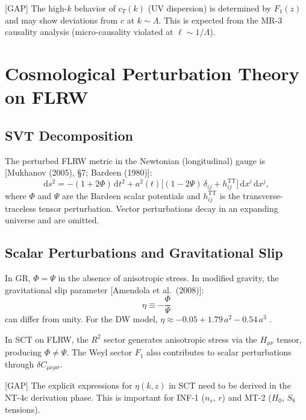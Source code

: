 \documentclass[12pt,a4paper]{article}
\theoremstyle{definition}
\theoremstyle{remark}
\newcommand{\dd}{\mathrm{d}}
\newcommand{\fromlit}[1]{\textcolor{blue!70!black}{\textsf{[#1]}}}
\newcommand{\gap}{\textcolor{red!80!black}{\textsf{[GAP]}}}
\begin{document}
\gap{} The high-$k$ behavior of $c_T(k)$ (UV dispersion) is
determined by $F_1(z)$ and may show deviations from $c$ at
$k \sim \Lambda$. This is expected from the MR-3 causality
analysis (micro-causality violated at $\ell \sim 1/\Lambda$).

\section{Cosmological Perturbation Theory on FLRW}
\label{sec:perturbations}

\subsection{SVT Decomposition}

The perturbed FLRW metric in the Newtonian (longitudinal) gauge is
\fromlit{Mukhanov (2005), \S7; Bardeen (1980)}:
\begin{equation}\label{eq:perturbed-metric}
  \dd s^2 = -(1 + 2\Phi)\,\dd t^2
  + a^2(t)\bigl[(1 - 2\Psi)\,\delta_{ij}
  + h_{ij}^{\mathrm{TT}}\bigr]\,\dd x^i\,\dd x^j,
\end{equation}
where $\Phi$ and $\Psi$ are the Bardeen scalar potentials and
$h_{ij}^{\mathrm{TT}}$ is the transverse-traceless tensor perturbation.
Vector perturbations decay in an expanding universe and are omitted.

\subsection{Scalar Perturbations and Gravitational Slip}

In GR, $\Phi = \Psi$ in the absence of anisotropic stress. In
modified gravity, the gravitational slip parameter
\fromlit{Amendola et al.\ (2008)}:
\begin{equation}\label{eq:grav-slip}
  \eta \equiv -\frac{\Phi}{\Psi}
\end{equation}
can differ from unity. For the DW model,
$\eta \approx -0.05 + 1.79\,a^2 - 0.54\,a^3$ \cite{NLA18}.

In SCT on FLRW, the $R^2$ sector generates anisotropic stress via
the $H_{\mu\nu}$ tensor, producing $\Phi \neq \Psi$. The Weyl
sector $F_1$ also contributes to scalar perturbations through
$\delta C_{\mu\nu\rho\sigma}$.

\gap{} The explicit expressions for $\eta(k, z)$ in SCT need
to be derived in the NT-4c derivation phase. This is important
for INF-1 ($n_s$, $r$) and MT-2 ($H_0$, $S_8$ tensions).
\end{document}
